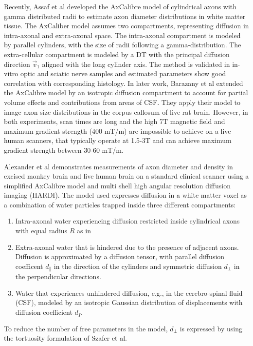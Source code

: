 Recently, Assaf et al\cite{assaf2008} developed the AxCalibre model of cylindrical axons with gamma distributed radii to estimate axon diameter distributions in white matter tissue. The AxCaliber model assumes two compartments, representing diffusion in intra-axonal and extra-axonal space. The intra-axonal compartment is modeled by parallel cylinders, with the size of radii following a gamma-distribution. The extra-cellular compartment is modeled by a DT with the principal diffusion direction $\vec{v}_1$ aligned with the long cylinder axis. The method is validated in in-vitro optic and sciatic nerve samples and estimated parameters show good correlation with corresponding histology. In later work, Barazany et al\cite{barazany2009} extended the AxCalibre model by an isotropic diffusion compartment to account for partial volume effects and contributions from areas of CSF. They apply their model to image axon size distributions in the corpus callosum of live rat brain. However, in both experiments, scan times are long and the high 7T magnetic field and maximum gradient strength (400 mT/m) are impossible to achieve on a live human scanners, that typically operate at 1.5-3T and can achieve maximum gradient strength between 30-60 mT/m. 


Alexander et al\cite{alexander2009} demonstrates measurements of axon diameter and density in excised monkey brain and live human brain on a standard clinical scanner using a simplified AxCalibre model and multi shell high angular resolution diffusion imaging (HARDI). The model used expresses diffusion in a white matter voxel as a combination of water particles trapped inside three different compartments: 
\begin{enumerate}
  \item Intra-axonal water experiencing diffusion restricted inside cylindrical axons with equal radius $R$ as in \cite{gelderen2000}
  \item Extra-axonal water that is hindered due to the presence of adjacent axons. Diffusion is approximated by a diffusion tensor, with parallel diffusion coefficent $d_\parallel$ in the direction of the cylinders and symmetric diffusion $d_\perp$ in the perpendicular directions.
  \item Water that experiences unhindered diffusion, e.g., in the cerebro-spinal fluid (CSF), modeled by an isotropic Gaussian distribution of displacements with diffusion coefficient $d_{I}$.
\end{enumerate}
To reduce the number of free parameters in the model, $d_\perp$ is expressed by using the tortuosity formulation of Szafer et al\cite{szafer1995}.

